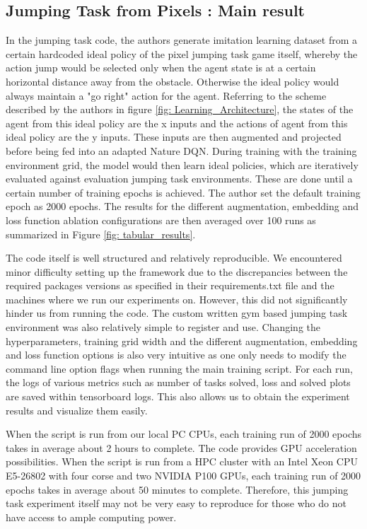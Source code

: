 \documentclass{usiinftr}
\begin{document}
\subsection{Jumping Task from Pixels : Main result}
In the jumping task code, the authors generate imitation learning dataset from a certain hardcoded ideal policy of the pixel jumping task game itself, whereby the action jump would be selected only when the agent state is at a certain horizontal distance away from the obstacle. Otherwise the ideal policy would always maintain a "go right" action for the agent. Referring to the scheme described by the authors in figure \ref{fig: Learning_Architecture}, the states of the agent from this ideal policy are the x inputs and the actions of agent from this ideal policy are the y inputs. These inputs are then augmented and projected before being fed into an adapted Nature DQN. During training with the training environment grid, the model would then learn ideal policies, which are iteratively evaluated against evaluation jumping task environments. These are done until a certain number of training epochs is achieved. The author set the default training epoch as 2000 epochs. The results for the different augmentation, embedding and loss function ablation configurations are then averaged over 100 runs as summarized in Figure \ref{fig: tabular_results}.

The code itself is well structured and relatively reproducible. We encountered minor difficulty setting up the framework due to the discrepancies between the required packages versions as specified in their requirements.txt file and the machines where we run our experiments on. However, this did not significantly hinder us from running the code. The custom written gym based jumping task environment was also relatively simple to register and use. Changing the hyperparameters, training grid width and the different augmentation, embedding and loss function options is also very intuitive as one only needs to modify the command line option flags when running the main training script. For each run, the logs of various metrics such as number of tasks solved, loss and solved plots are saved within tensorboard logs. This also allows us to obtain the experiment results and visualize them easily. 

When the script is run from our local PC CPUs, each training run of 2000 epochs takes in average about 2 hours to complete. The code provides GPU acceleration possibilities. When the script is run from a HPC cluster with an Intel Xeon CPU E5-26802 with four corse and two NVIDIA P100 GPUs, each training run of 2000 epochs takes in average about 50 minutes to complete. Therefore, this jumping task experiment itself may not be very easy to reproduce for those who do not have access to ample computing power.
\end{document}
